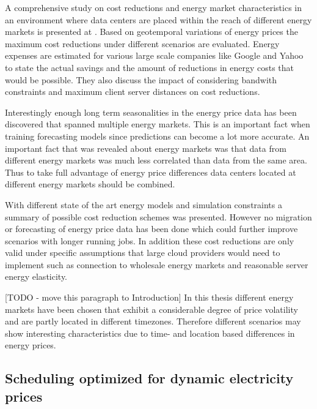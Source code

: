 A comprehensive study on cost reductions and energy market characteristics in an environment where data centers are placed within the reach of different energy markets is presented at \cite{qureshi2009cutting}. Based on geotemporal variations of energy prices the maximum cost reductions under different scenarios are evaluated. Energy expenses are estimated for various large scale companies like Google and Yahoo to state the actual savings and the amount of reductions in energy costs that would be possible. 
They also discuss the impact of considering bandwith constraints and maximum client server distances on cost reductions. 

Interestingly enough long term seasonalities in the energy price data has been discovered that spanned multiple energy markets. This is an important fact when training forecasting models since predictions can become a lot more accurate. An important fact that was revealed about energy markets was that data from different energy markets was much less correlated than data from the same area. Thus to take full advantage of energy price differences data centers located at different energy markets should be combined. 

With different state of the art energy models and simulation constraints a summary of possible cost reduction schemes was presented. However no migration or forecasting of energy price data has been done which could further improve scenarios with longer running jobs. In addition these cost reductions are only valid under specific assumptions that large cloud providers would need to implement such as connection to wholesale energy markets and reasonable server energy elasticity. 



[TODO - move this paragraph to Introduction]
In this thesis different energy markets have been chosen that exhibit a considerable degree of price volatility and are partly located in different timezones. Therefore different scenarios may show interesting characteristics due to time- and location based differences in energy prices. 



\subsection{Scheduling optimized for dynamic electricity prices}

